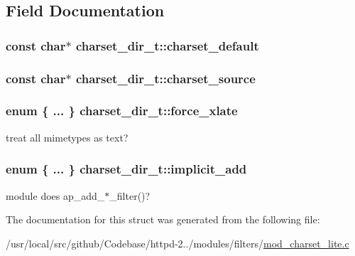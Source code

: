 \subsection{Field Documentation}
\subsubsection[{\texorpdfstring{charset\+\_\+default}{charset_default}}]{\setlength{\rightskip}{0pt plus 5cm}const char$\ast$ charset\+\_\+dir\+\_\+t\+::charset\+\_\+default}\hypertarget{structcharset__dir__t_ad92d0621427301c4372da7c9a22900db}{}\label{structcharset__dir__t_ad92d0621427301c4372da7c9a22900db}
\subsubsection[{\texorpdfstring{charset\+\_\+source}{charset_source}}]{\setlength{\rightskip}{0pt plus 5cm}const char$\ast$ charset\+\_\+dir\+\_\+t\+::charset\+\_\+source}\hypertarget{structcharset__dir__t_a54e5aee3200a70fdaa499b8ed78e6213}{}\label{structcharset__dir__t_a54e5aee3200a70fdaa499b8ed78e6213}
\subsubsection[{\texorpdfstring{force\+\_\+xlate}{force_xlate}}]{\setlength{\rightskip}{0pt plus 5cm}enum \{ ... \}   charset\+\_\+dir\+\_\+t\+::force\+\_\+xlate}\hypertarget{structcharset__dir__t_aa02f3a05d101bf1c9ed08e2e5eb36f3a}{}\label{structcharset__dir__t_aa02f3a05d101bf1c9ed08e2e5eb36f3a}
treat all mimetypes as text? 
\subsubsection[{\texorpdfstring{implicit\+\_\+add}{implicit_add}}]{\setlength{\rightskip}{0pt plus 5cm}enum \{ ... \}   charset\+\_\+dir\+\_\+t\+::implicit\+\_\+add}\hypertarget{structcharset__dir__t_a3cfdcc0e2650378de597a70f2a77a5dc}{}\label{structcharset__dir__t_a3cfdcc0e2650378de597a70f2a77a5dc}
module does ap\+\_\+add\+\_\+$\ast$\+\_\+filter()? 

The documentation for this struct was generated from the following file\+:\begin{DoxyCompactItemize}
\item 
/usr/local/src/github/\+Codebase/httpd-\/2../modules/filters/\hyperlink{mod__charset__lite_8c}{mod\+\_\+charset\+\_\+lite.\+c}\end{DoxyCompactItemize}
